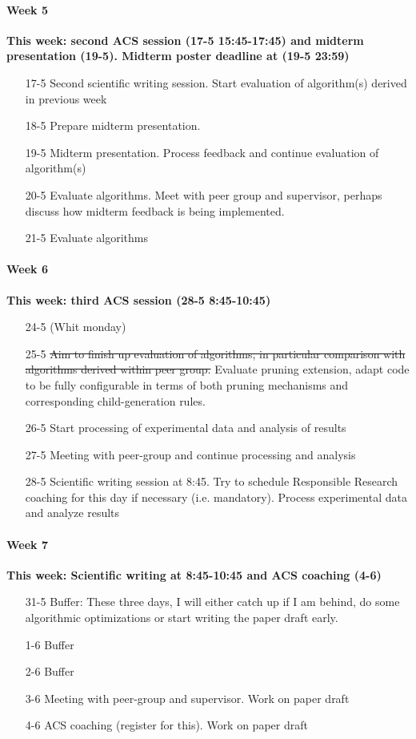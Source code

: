 \documentclass[a4paper,10pt,english]{article}
\begin{document}
	\paragraph{Week 5} \textbf{This week: second ACS session (17-5 15:45-17:45) and midterm presentation (19-5). Midterm poster deadline at (19-5 23:59)}
	\begin{enumerate}
		\item[17-5 ] Second scientific writing session. Start evaluation of algorithm(s) derived in previous week
		\item[18-5 ] Prepare midterm presentation.
		\item[19-5 ] Midterm presentation. Process feedback and continue evaluation of algorithm(s)
		\item[20-5 ] Evaluate algorithms. Meet with peer group and supervisor, perhaps discuss how midterm feedback is being implemented.
		\item[21-5 ] Evaluate algorithms
	\end{enumerate}
	\paragraph{Week 6} \textbf{This week: third ACS session (28-5 8:45-10:45)}
	\begin{enumerate}
		\item[24-5 ] (Whit monday)
		\item[25-5 ] \sout{Aim to finish up evaluation of algorithms, in particular comparison with algorithms derived within peer group.} Evaluate pruning extension, adapt code to be fully configurable in terms of both pruning mechanisms and corresponding child-generation rules.
		\item[26-5 ] Start processing of experimental data and analysis of results
		\item[27-5 ] Meeting with peer-group and continue processing and analysis
		\item[28-5 ] Scientific writing session at 8:45. Try to schedule Responsible Research coaching for this day if necessary (i.e. mandatory). Process experimental data and analyze results
	\end{enumerate}
	\paragraph{Week 7} \textbf{This week: Scientific writing at 8:45-10:45 and ACS coaching (4-6)}
	\begin{enumerate}
		\item[31-5 ] Buffer: These three days, I will either catch up if I am behind, do some algorithmic optimizations or start writing the paper draft early.
		\item[1-6 ] Buffer
		\item[2-6 ] Buffer
		\item[3-6 ] Meeting with peer-group and supervisor. Work on paper draft
		\item[4-6 ] ACS coaching (register for this). Work on paper draft 
	\end{enumerate}
\end{document}
